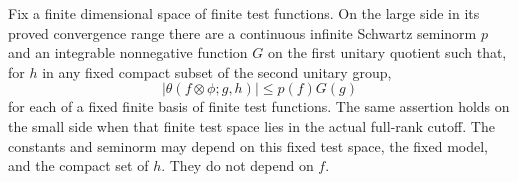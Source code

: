 \begin{srlemma}
\label{lem:sr-theta-integrated-seminorm}
Fix a finite dimensional space of finite test functions.
On the large side in its proved convergence range there are a
continuous infinite Schwartz seminorm \(p\) and an integrable
nonnegative function \(G\) on the first unitary quotient such that,
for \(h\) in any fixed compact subset of the second unitary group,
\[
 |\theta(f\otimes\phi;g,h)|\le p(f)G(g)
 \tag{T5}\label{eq:sr-theta-seminorm-domination}
\]
for each of a fixed finite basis of finite test functions.
The same assertion holds on the small side when that finite test
space lies in the actual full-rank cutoff.
The constants and seminorm may depend on this fixed test space,
the fixed model, and the compact set of \(h\).
They do not depend on \(f\).
\end{srlemma}

